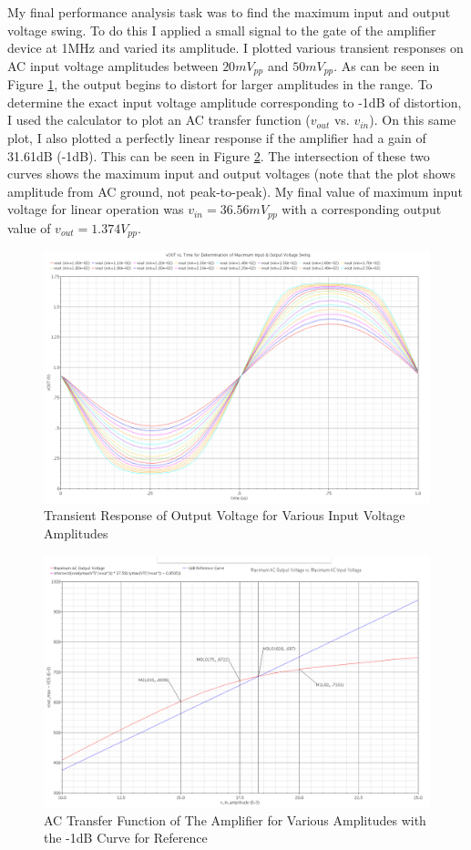 \documentclass{article}
\begin{document}
My final performance analysis task was to find the maximum input and output voltage swing. To do this I applied a small signal to the gate of the amplifier device at 1MHz and varied its amplitude. I plotted various transient responses on AC input voltage amplitudes between $20mV_{pp}$ and $50mV_{pp}$. As can be seen in Figure \ref{cs_tran}, the output begins to distort for larger amplitudes in the range. To determine the exact input voltage amplitude corresponding to -1dB of distortion, I used the calculator to plot an AC transfer function ($v_{out}$ vs. $v_{in}$). On this same plot, I also plotted a perfectly linear response if the amplifier had a gain of 31.61dB (-1dB). This can be seen in Figure \ref{cs_lin}. The intersection of these two curves shows the maximum input and output voltages (note that the plot shows amplitude from AC ground, not peak-to-peak). My final value of maximum input voltage for linear operation was $v_{in} = 36.56mV_{pp}$ with a corresponding output value of $v_{out} = 1.374V_{pp}$.

\begin{figure}[H]
\centering
\includegraphics[width=7in]{2_cs_transient.png}
\caption{Transient Response of Output Voltage for Various Input Voltage Amplitudes}
\label{cs_tran}
\end{figure}

\begin{figure}[H]
\centering
\includegraphics[width=7in]{2_cs_linearity.png}
\caption{AC Transfer Function of The Amplifier for Various Amplitudes with the -1dB Curve for Reference}
\label{cs_lin}
\end{figure}
\newpage
\end{document}
